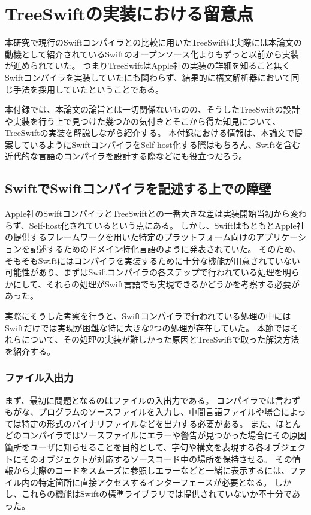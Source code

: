 \appendix
\chapter{TreeSwiftの実装における留意点}

本研究で現行のSwiftコンパイラとの比較に用いたTreeSwiftは実際には本論文の動機として紹介されているSwiftのオープンソース化よりもずっと以前から実装が進められていた。
つまりTreeSwiftはApple社の実装の詳細を知ること無くSwiftコンパイラを実装していたにも関わらず、結果的に構文解析器において同じ手法を採用していたということである。

本付録では、本論文の論旨とは一切関係ないものの、そうしたTreeSwiftの設計や実装を行う上で見つけた幾つかの気付きとそこから得た知見について、TreeSwiftの実装を解説しながら紹介する。
本付録における情報は、本論文で提案しているようにSwiftコンパイラをSelf-host化する際はもちろん、Swiftを含む近代的な言語のコンパイラを設計する際などにも役立つだろう。


\section{SwiftでSwiftコンパイラを記述する上での障壁}

Apple社のSwiftコンパイラとTreeSwiftとの一番大きな差は実装開始当初から変わらず、Self-host化されているという点にある。
しかし、SwiftはもともとApple社の提供するフレームワークを用いた特定のプラットフォーム向けのアプリケーションを記述するためのドメイン特化言語のように発表されていた。
そのため、そもそもSwiftにはコンパイラを実装するために十分な機能が用意されていない可能性があり、まずはSwiftコンパイラの各ステップで行われている処理を明らかにして、それらの処理がSwift言語でも実現できるかどうかを考察する必要があった。

実際にそうした考察を行うと、Swiftコンパイラで行われている処理の中にはSwiftだけでは実現が困難な特に大きな2つの処理が存在していた。
本節ではそれらについて、その処理の実装が難しかった原因とTreeSwiftで取った解決方法を紹介する。

\subsection{ファイル入出力}

まず、最初に問題となるのはファイルの入出力である。
コンパイラでは言わずもがな、プログラムのソースファイルを入力し、中間言語ファイルや場合によっては特定の形式のバイナリファイルなどを出力する必要がある。
また、ほとんどのコンパイラではソースファイルにエラーや警告が見つかった場合にその原因箇所をユーザに知らせることを目的として、字句や構文を表現する各オブジェクトにそのオブジェクトが対応するソースコード中の場所を保持させる。
その情報から実際のコードをスムーズに参照しエラーなどと一緒に表示するには、ファイル内の特定箇所に直接アクセスするインターフェースが必要となる。
しかし、これらの機能はSwiftの標準ライブラリでは提供されていないか不十分であった。

